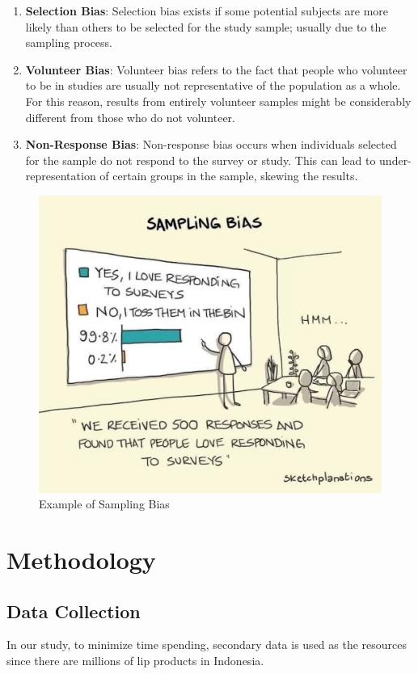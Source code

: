 \documentclass{article}
\begin{document}
\begin{enumerate}
    \item \textbf{Selection Bias}: Selection bias exists if some potential subjects are more likely than others to be selected for the study sample; usually due to the sampling process.

    \item \textbf{Volunteer Bias}: Volunteer bias refers to the fact that people who volunteer to be in studies are usually not representative of the population as a whole. For this reason, results from entirely volunteer samples might be considerably different from those who do not volunteer.

    \item \textbf{Non-Response Bias}: Non-response bias occurs when individuals selected for the sample do not respond to the survey or study. This can lead to under-representation of certain groups in the sample, skewing the results.
\end{enumerate}
\begin{figure}[htbp]
    \centering
    \includegraphics[scale = 0.25]{../images/sampling_bias_meme.jpeg}
    \caption{Example of Sampling Bias}
    \label{Sampling_Bias}
\end{figure}
\section{Methodology}
\subsection{Data Collection}
In our study, to minimize time spending, secondary data is used as the resources since there are millions of lip products in Indonesia.
\end{document}
